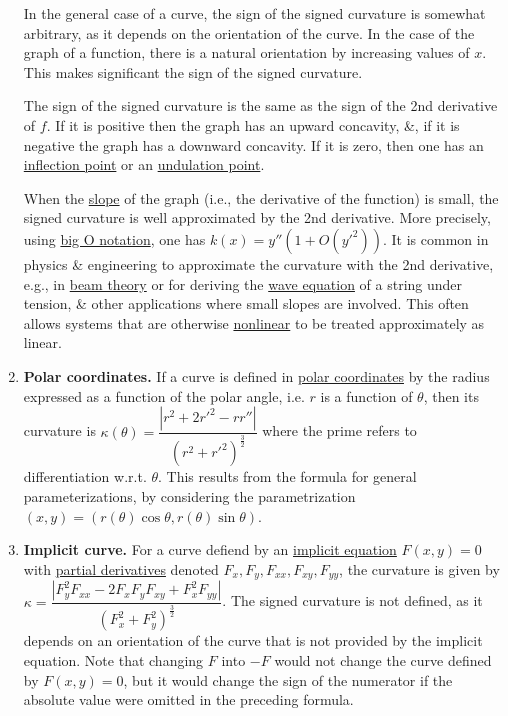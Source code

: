 \documentclass{article}
\begin{document}
\begin{enumerate}
	In the general case of a curve, the sign of the signed curvature is somewhat arbitrary, as it depends on the orientation of the curve. In the case of the graph of a function, there is a natural orientation by increasing values of $x$. This makes significant the sign of the signed curvature.
	
	The sign of the signed curvature is the same as the sign of the 2nd derivative of $f$. If it is positive then the graph has an upward concavity, \&, if it is negative the graph has a downward concavity. If it is zero, then one has an \href{https://en.wikipedia.org/wiki/Inflection_point}{inflection point} or an \href{https://en.wikipedia.org/wiki/Undulation_point}{undulation point}.
	
	When the \href{https://en.wikipedia.org/wiki/Slope}{slope} of the graph (i.e., the derivative of the function) is small, the signed curvature is well approximated by the 2nd derivative. More precisely, using \href{https://en.wikipedia.org/wiki/Big_O_notation}{big O notation}, one has $k(x) = y''(1 + O(y'^2))$. It is common in physics \& engineering to approximate the curvature with the 2nd derivative, e.g., in \href{https://en.wikipedia.org/wiki/Beam_theory}{beam theory} or for deriving the \href{https://en.wikipedia.org/wiki/Wave_equation}{wave equation} of a string under tension, \& other applications where small slopes are involved. This often allows systems that are otherwise \href{https://en.wikipedia.org/wiki/Nonlinear_system}{nonlinear} to be treated approximately as linear.
	\item {\bf Polar coordinates.} If a curve is defined in \href{https://en.wikipedia.org/wiki/Polar_coordinates}{polar coordinates} by the radius expressed as a function of the polar angle, i.e. $r$ is a function of $\theta$, then its curvature is $\kappa(\theta) = \dfrac{|r^2 + 2r'^2 - rr''|}{(r^2 + r'^2)^{\frac{3}{2}}}$ where the prime refers to differentiation w.r.t. $\theta$. This results from the formula for general parameterizations, by considering the parametrization $(x,y) = (r(\theta)\cos\theta,r(\theta)\sin\theta)$.
	\item {\bf Implicit curve.} For a curve defiend by an \href{https://en.wikipedia.org/wiki/Implicit_equation}{implicit equation} $F(x,y) = 0$ with \href{https://en.wikipedia.org/wiki/Partial_derivatives}{partial derivatives} denoted $F_x,F_y,F_{xx},F_{xy},F_{yy}$, the curvature is given by $\kappa = \dfrac{|F_y^2F_{xx} - 2F_xF_yF_{xy} + F_x^2F_{yy}|}{(F_x^2 + F_y^2)^{\frac{3}{2}}}$. The signed curvature is not defined, as it depends on an orientation of the curve that is not provided by the implicit equation. Note that changing $F$ into $-F$ would not change the curve defined by $F(x,y) = 0$, but it would change the sign of the numerator if the absolute value were omitted in the preceding formula.
	

\end{enumerate}
\end{document}
